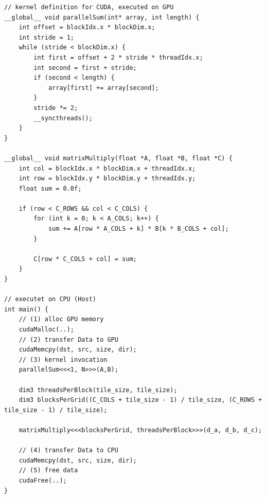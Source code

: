 \begin{lstlisting}
// kernel definition for CUDA, executed on GPU
__global__ void parallelSum(int* array, int length) {
	int offset = blockIdx.x * blockDim.x;
	int stride = 1;
	while (stride < blockDim.x) {
		int first = offset + 2 * stride * threadIdx.x;
		int second = first + stride;
		if (second < length) {
			array[first] += array[second];
		}
		stride *= 2;
		__syncthreads();
	}
}

__global__ void matrixMultiply(float *A, float *B, float *C) {
	int col = blockIdx.x * blockDim.x + threadIdx.x;
	int row = blockIdx.y * blockDim.y + threadIdx.y;
	float sum = 0.0f;
	
	if (row < C_ROWS && col < C_COLS) {
		for (int k = 0; k < A_COLS; k++) {
			sum += A[row * A_COLS + k] * B[k * B_COLS + col];
		}
		
		C[row * C_COLS + col] = sum;
	}
}

// executet on CPU (Host)
int main() {
	// (1) alloc GPU memory
	cudaMalloc(..); 		
	// (2) transfer Data to GPU			
	cudaMemcpy(dst, src, size, dir); 
	// (3) kernel invocation	
	parallelSum<<<1, N>>>(A,B); 
	
    dim3 threadsPerBlock(tile_size, tile_size);
	dim3 blocksPerGrid((C_COLS + tile_size - 1) / tile_size, (C_ROWS + tile_size - 1) / tile_size);
	
	matrixMultiply<<<blocksPerGrid, threadsPerBlock>>>(d_a, d_b, d_c);
	
	// (4) transfer Data to CPU	
	cudaMemcpy(dst, src, size, dir); 
	// (5) free data	
	cudaFree(..);						
}
\end{lstlisting}

